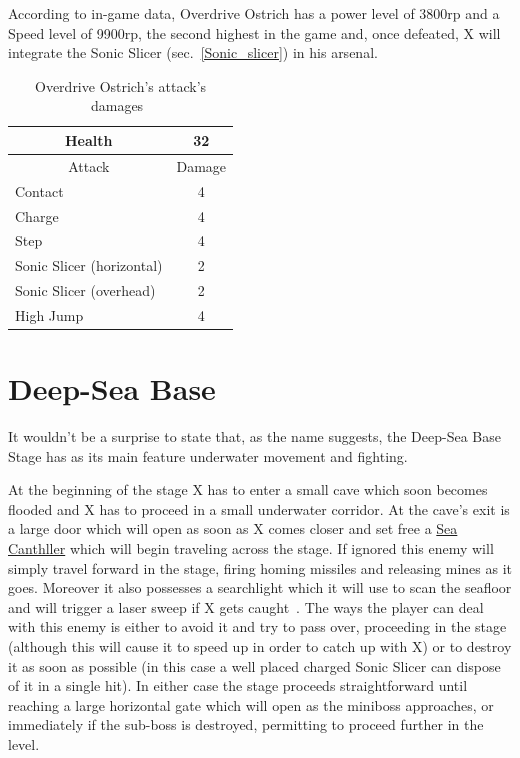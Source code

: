 According to in-game data, Overdrive Ostrich has a power level of 3800rp and a Speed level of 9900rp, the second highest in the game and, once defeated, X will integrate the Sonic Slicer (sec.~\ref{Sonic_slicer}) in his arsenal.

\begin{table}[htp]
	\centering
	\begin{tabular}[h]{l c}
		\toprule
		\multicolumn{1}{c}{Health}  & 32 \\
		\midrule
		\multicolumn{1}{c}{Attack} & \multicolumn{1}{c}{Damage}\\
		Contact & 4 \\
		Charge & 4\\
		Step& 4\\
		Sonic Slicer (horizontal) & 2\\
		Sonic Slicer (overhead) & 2\\
		High Jump & 4\\
		\bottomrule
	\end{tabular}
	\caption{Overdrive Ostrich's attack's damages~\cite{wiki:Overdrive_Ostrich}}
\end{table}

\section{Deep-Sea Base}
It wouldn't be a surprise to state that, as the name suggests, the Deep-Sea Base Stage has as its main feature underwater movement and fighting.

At the beginning of the stage X has to enter a small cave which soon becomes flooded and X has to proceed in a small underwater corridor. At the cave's exit  is a large door which will open as soon as X comes closer and set free a \hyperlink{miniboss:Sea_Canthller}{Sea Canthller} which will begin traveling across the stage. If ignored this enemy will simply travel forward in the stage, firing homing missiles and releasing mines as it goes. Moreover it also possesses a searchlight which it will use to scan the seafloor and will trigger a laser sweep if X gets caught~\cite{wiki:Sea_Canthller}. The ways the player can deal with this enemy is either to avoid it and try to pass over, proceeding in the stage (although this will cause it to speed up in order to catch up with X) or to destroy it as soon as possible (in this case a well placed charged Sonic Slicer can dispose of it in a single hit). In either case the stage proceeds straightforward until reaching a large horizontal gate which will open as the miniboss approaches, or immediately if the sub-boss is destroyed, permitting to proceed further in the level.


